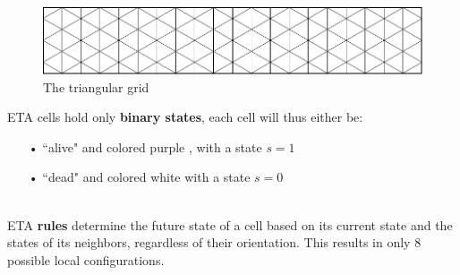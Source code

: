 \documentclass{article}
\begin{document}
\begin{figure}[H]
    \centering
    \includegraphics[width=.75\textwidth]{graphics/introduction/grid.pdf}
    \caption{The triangular grid}
    \label{fig:triangular-grid}
\end{figure}

\noindent ETA cells hold only \textbf{binary states}, each cell will thus either be:
\begin{enumerate}
    \item[•] ``alive" and colored purple , with a state $s=1$ 
    \item[•] ``dead" and colored white   with a state $s=0$
\end{enumerate}
\  \\
ETA \textbf{rules} determine the future state of a cell based on its current state and the states of its neighbors, regardless of their orientation. This results in only 8 possible local configurations.
\end{document}
